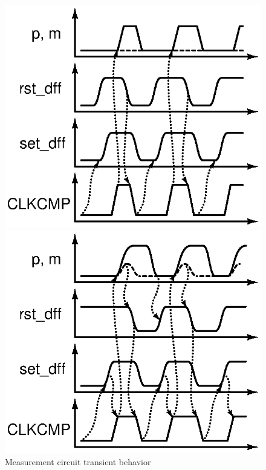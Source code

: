 \begin{figure}[htp]
	\begin{minipage}[b]{0.47\linewidth}
	\includegraphics[width=\linewidth]{Chapter5/Figs/test_delay_comp_new_tare0_bypass1.ps}
	\end{minipage}
	\begin{minipage}[b]{0.47\linewidth}
	\includegraphics[width=\linewidth]{Chapter5/Figs/test_delay_comp_new_tare1_bypass1.ps}
	\end{minipage}
	\caption{Measurement circuit transient behavior}
	\label{fig:meas_circ_trans}
	\vspace{-1em}
\end{figure}

